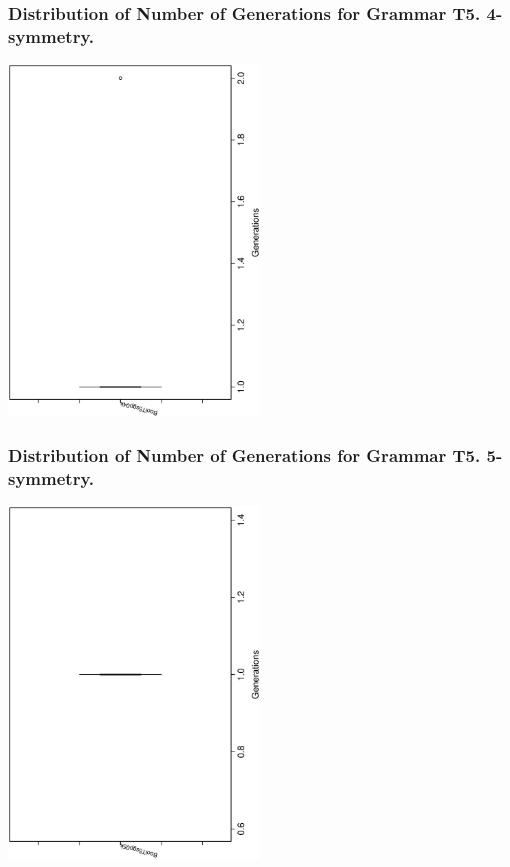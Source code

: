 \documentclass[18pt,c]{beamer}
\begin{document}
 \begin{frame}
 \frametitle{ Distribution of Number of Generations for Grammar T5. 4-symmetry. }
 \begin{center}
\includegraphics[width=0.5\textwidth, angle=-90]
{ExpFboxplottGenerations002.eps}
 \end{center}
 \label{ExpFboxplottGenerations002.eps}  
 \end{frame}

 \begin{frame}
 \frametitle{ Distribution of Number of Generations for Grammar T5. 5-symmetry. }
 \begin{center}
\includegraphics[width=0.5\textwidth, angle=-90]
{ExpFboxplottGenerations003.eps}
 \end{center}
 \label{ExpFboxplottGenerations003.eps}  
 \end{frame}
\end{document}
